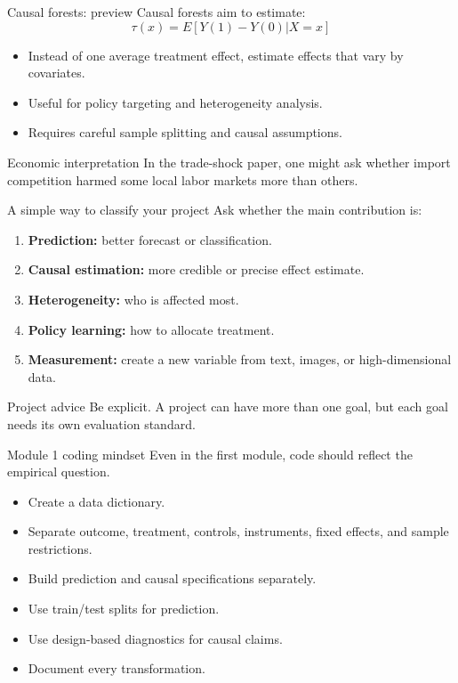 \documentclass[aspectratio=169,11pt]{beamer}
\newcommand{\econ}[1]{\begin{exampleblock}{Economic interpretation}#1\end{exampleblock}}
\begin{document}
\begin{frame}{Causal forests: preview}
Causal forests aim to estimate:
\[
\tau(x)=E[Y(1)-Y(0)|X=x]
\]
\begin{itemize}
  \item Instead of one average treatment effect, estimate effects that vary by covariates.
  \item Useful for policy targeting and heterogeneity analysis.
  \item Requires careful sample splitting and causal assumptions.
\end{itemize}
\econ{
In the trade-shock paper, one might ask whether import competition harmed some local labor markets more than others.
}
\end{frame}

\begin{frame}{A simple way to classify your project}
Ask whether the main contribution is:
\begin{enumerate}
  \item \textbf{Prediction:} better forecast or classification.
  \item \textbf{Causal estimation:} more credible or precise effect estimate.
  \item \textbf{Heterogeneity:} who is affected most.
  \item \textbf{Policy learning:} how to allocate treatment.
  \item \textbf{Measurement:} create a new variable from text, images, or high-dimensional data.
\end{enumerate}
\begin{block}{Project advice}
Be explicit. A project can have more than one goal, but each goal needs its own evaluation standard.
\end{block}
\end{frame}

\begin{frame}{Module 1 coding mindset}
Even in the first module, code should reflect the empirical question.
\begin{itemize}
  \item Create a data dictionary.
  \item Separate outcome, treatment, controls, instruments, fixed effects, and sample restrictions.
  \item Build prediction and causal specifications separately.
  \item Use train/test splits for prediction.
  \item Use design-based diagnostics for causal claims.
  \item Document every transformation.
\end{itemize}
\end{frame}
\end{document}
